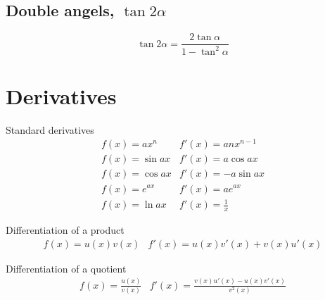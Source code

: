 \documentclass[a4paper, 10pt]{scrartcl}
\begin{document}
\subsection{Double angels, $\tan{2\alpha}$}
\[\tan{2\alpha} = \frac{2\tan{\alpha}}{1 - \tan^{2}{\alpha}}\]

\section{Derivatives}

Standard derivatives
\begin{eqnarray}
f(x) = ax^{n} & f'(x) = anx^{n - 1}\\
f(x) = \sin{ax} & f'(x) = a\cos{ax}\\
f(x) = \cos{ax} & f'(x) = -a\sin{ax}\\
f(x) = e^{ax} & f'(x) = ae^{ax}\\
f(x) = \ln{ax} & f'(x) = \frac{1}{x}
\end{eqnarray}

Differentiation of a product
\begin{eqnarray}
f(x) = u(x)v(x) & f'(x) = u(x)v'(x) + v(x)u'(x)
\end{eqnarray}

Differentiation of a quotient
\begin{eqnarray}
f(x) = \frac{u(x)}{v(x)} & f'(x) = \frac{v(x)u'(x) - u(x)v'(x)}{v^{2}(x)}
\end{eqnarray}
\end{document}
